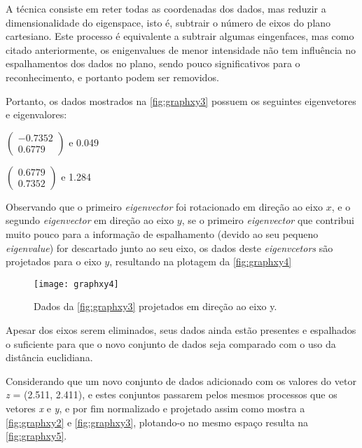A técnica consiste em reter todas as coordenadas dos dados, mas reduzir a dimensionalidade do eigenspace, isto é, subtrair o número de eixos do plano cartesiano. Este processo é equivalente a subtrair algumas eingenfaces, mas como citado anteriormente, os enigenvalues de menor intensidade não tem influência no espalhamentos dos dados no plano, sendo pouco significativos para o reconhecimento, e portanto podem ser removidos.

Portanto, os dados mostrados na  \autoref{fig:graphxy3} possuem os seguintes eigenvetores e eigenvalores:

\begin{center}
	$\begin{pmatrix} -0.7352 \\ 0.6779 \end{pmatrix}$  e 0.049
	
	$\begin{pmatrix} 0.6779 \\ 0.7352 \end{pmatrix}$  e 1.284
\end{center}

Observando que o primeiro \textit{eigenvector} foi rotacionado em direção ao eixo $x$, e o segundo \textit{eigenvector} em direção ao eixo $y$, se o primeiro \textit{eigenvector} que contribui muito pouco para a informação de espalhamento (devido ao seu pequeno \textit{eigenvalue}) for descartado junto ao seu eixo, os dados deste \textit{eigenvcetors} são projetados para o eixo $y$, resultando na plotagem da \autoref{fig:graphxy4}

\begin{figure}[h]
	\centering
	\texttt{[image: graphxy4]}
	\caption{Dados da \autoref{fig:graphxy3} projetados em direção ao eixo y.}
	\label{fig:graphxy4}
\end{figure}


Apesar dos eixos serem eliminados, seus dados ainda estão presentes e espalhados o suficiente para que o novo conjunto de dados seja comparado com o uso da distância euclidiana.

Considerando que um novo conjunto de dados adicionado com os valores do vetor \textit{z} = (2.511, 2.411), e estes conjuntos passarem pelos mesmos processos que os vetores \textit{x} e \textit{y}, e por fim normalizado e projetado assim como mostra a \autoref{fig:graphxy2} e \autoref{fig:graphxy3}, plotando-o no mesmo espaço resulta na \autoref{fig:graphxy5}.

